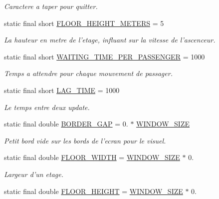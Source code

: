 \begin{DoxyCompactItemize}
\begin{DoxyCompactList}\small\item\em Caractere a taper pour quitter. \end{DoxyCompactList}\item 
static final short \hyperlink{classDefines_aae6f35fc0dc85e4189f0be67c6af6fb1}{F\-L\-O\-O\-R\-\_\-\-H\-E\-I\-G\-H\-T\-\_\-\-M\-E\-T\-E\-R\-S} = 5
\begin{DoxyCompactList}\small\item\em La hauteur en metre de l'etage, influant sur la vitesse de l'ascenceur. \end{DoxyCompactList}\item 
static final short \hyperlink{classDefines_aece514c1581f2329ad852547b512827c}{W\-A\-I\-T\-I\-N\-G\-\_\-\-T\-I\-M\-E\-\_\-\-P\-E\-R\-\_\-\-P\-A\-S\-S\-E\-N\-G\-E\-R} = 1000
\begin{DoxyCompactList}\small\item\em Temps a attendre pour chaque mouvement de passager. \end{DoxyCompactList}\item 
static final short \hyperlink{classDefines_a496860d61bb30a925275bfde3ddc3b20}{L\-A\-G\-\_\-\-T\-I\-M\-E} = 1000
\begin{DoxyCompactList}\small\item\em Le temps entre deux update. \end{DoxyCompactList}\item 
static final double \hyperlink{classDefines_ae1cb2849525afcbee188dd5681a29f2f}{B\-O\-R\-D\-E\-R\-\_\-\-G\-A\-P} = 0. $\ast$ \hyperlink{classDefines_aafb660e1c1534aec4d2cee6cfe57029f}{W\-I\-N\-D\-O\-W\-\_\-\-S\-I\-Z\-E}
\begin{DoxyCompactList}\small\item\em Petit bord vide sur les bords de l'ecran pour le visuel. \end{DoxyCompactList}\item 
static final double \hyperlink{classDefines_ad5528ce6b91911a4ca4e9f364543ef9c}{F\-L\-O\-O\-R\-\_\-\-W\-I\-D\-T\-H} = \hyperlink{classDefines_aafb660e1c1534aec4d2cee6cfe57029f}{W\-I\-N\-D\-O\-W\-\_\-\-S\-I\-Z\-E} $\ast$ 0.
\begin{DoxyCompactList}\small\item\em Largeur d'un etage. \end{DoxyCompactList}\item 
static final double \hyperlink{classDefines_a2a43fe315bf385b8693c70fbf824a3d0}{F\-L\-O\-O\-R\-\_\-\-H\-E\-I\-G\-H\-T} = \hyperlink{classDefines_aafb660e1c1534aec4d2cee6cfe57029f}{W\-I\-N\-D\-O\-W\-\_\-\-S\-I\-Z\-E} $\ast$ 0.

\end{DoxyCompactItemize}

